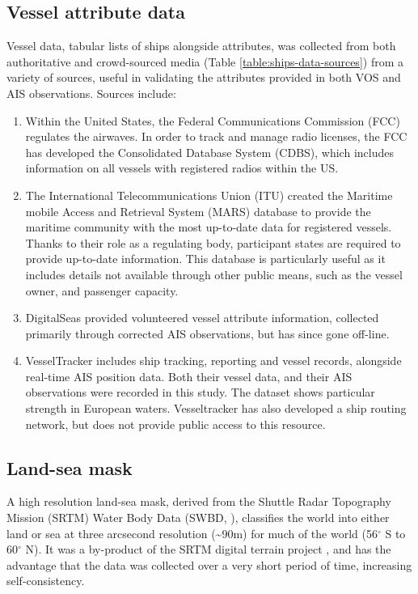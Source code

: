 \subsection{Vessel attribute data}
Vessel data, tabular lists of ships alongside attributes, was collected from both authoritative and crowd-sourced media (Table \ref{table:ships-data-sources}) from a variety of sources, useful in validating the attributes provided in both VOS and AIS observations. Sources include:
\begin{enumerate}
  \item Within the United States, the Federal Communications Commission (FCC) regulates the airwaves. In order to track and manage radio licenses, the FCC has developed the Consolidated Database System (CDBS), which includes information on all vessels with registered radios within the US. 
  \item The International Telecommunications Union (ITU) created the Maritime mobile Access and Retrieval System (MARS) database to provide the maritime community with the most up-to-date data for registered vessels. Thanks to their role as a regulating body, participant states are required to provide up-to-date information. This database is particularly useful as it includes details not available through other public means, such as the vessel owner, and passenger capacity.
  \item DigitalSeas provided volunteered vessel attribute information, collected primarily through corrected AIS observations, but has since gone off-line.
  \item VesselTracker includes ship tracking, reporting and vessel records, alongside real-time AIS position data. Both their vessel data, and their AIS observations were recorded in this study. The dataset shows particular strength in European waters. Vesseltracker has also developed a ship routing network, but does not provide public access to this resource.
\end{enumerate}

\subsection{Land-sea mask}
\label{sec:land-sea-mask}
  A high resolution land-sea mask, derived from the Shuttle Radar Topography Mission (SRTM) Water Body Data (SWBD, \citealp{slater2006srtm}), classifies the world into either land or sea at three arcsecond resolution (\textasciitilde{}90m) for much of the world (56$^\circ$ S to 60$^\circ$ N). It was a by-product of the SRTM digital terrain project \citep{rabus2003shuttle}, and has the advantage that the data was collected over a very short period of time, increasing self-consistency.

